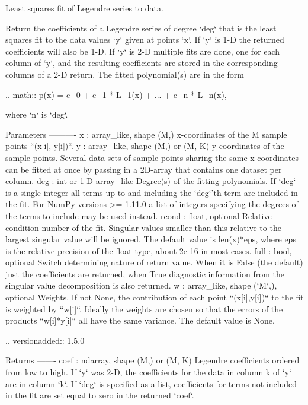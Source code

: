 \begin{DoxyVerb}Least squares fit of Legendre series to data.

Return the coefficients of a Legendre series of degree `deg` that is the
least squares fit to the data values `y` given at points `x`. If `y` is
1-D the returned coefficients will also be 1-D. If `y` is 2-D multiple
fits are done, one for each column of `y`, and the resulting
coefficients are stored in the corresponding columns of a 2-D return.
The fitted polynomial(s) are in the form

.. math::  p(x) = c_0 + c_1 * L_1(x) + ... + c_n * L_n(x),

where `n` is `deg`.

Parameters
----------
x : array_like, shape (M,)
    x-coordinates of the M sample points ``(x[i], y[i])``.
y : array_like, shape (M,) or (M, K)
    y-coordinates of the sample points. Several data sets of sample
    points sharing the same x-coordinates can be fitted at once by
    passing in a 2D-array that contains one dataset per column.
deg : int or 1-D array_like
    Degree(s) of the fitting polynomials. If `deg` is a single integer
    all terms up to and including the `deg`'th term are included in the
    fit. For NumPy versions >= 1.11.0 a list of integers specifying the
    degrees of the terms to include may be used instead.
rcond : float, optional
    Relative condition number of the fit. Singular values smaller than
    this relative to the largest singular value will be ignored. The
    default value is len(x)*eps, where eps is the relative precision of
    the float type, about 2e-16 in most cases.
full : bool, optional
    Switch determining nature of return value. When it is False (the
    default) just the coefficients are returned, when True diagnostic
    information from the singular value decomposition is also returned.
w : array_like, shape (`M`,), optional
    Weights. If not None, the contribution of each point
    ``(x[i],y[i])`` to the fit is weighted by ``w[i]``. Ideally the
    weights are chosen so that the errors of the products ``w[i]*y[i]``
    all have the same variance.  The default value is None.

    .. versionadded:: 1.5.0

Returns
-------
coef : ndarray, shape (M,) or (M, K)
    Legendre coefficients ordered from low to high. If `y` was
    2-D, the coefficients for the data in column k of `y` are in
    column `k`. If `deg` is specified as a list, coefficients for
    terms not included in the fit are set equal to zero in the
    returned `coef`.


\end{DoxyVerb}
